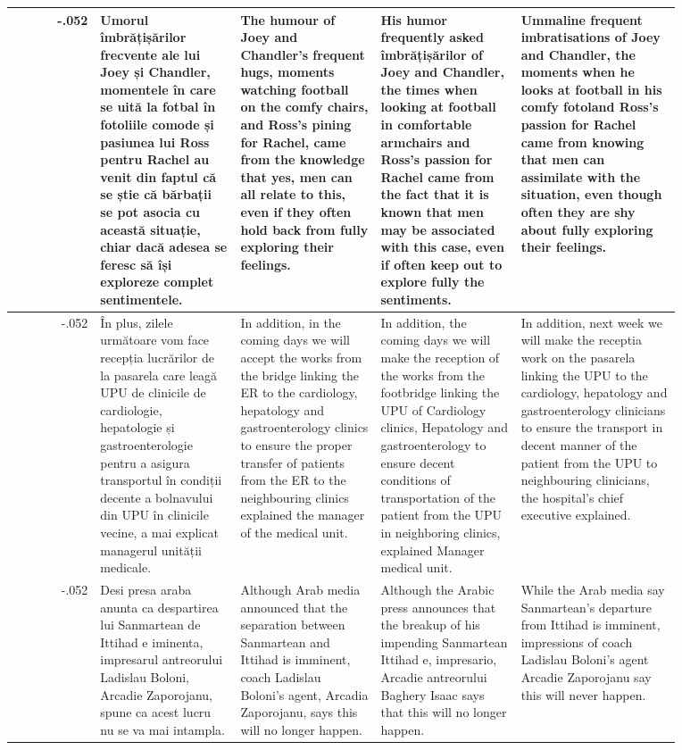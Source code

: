 \begin{table}[ht]
\begin{tabular}{r @{\hspace{1mm}} p{0.21\linewidth}p{0.21\linewidth}p{0.21\linewidth}p{0.24\linewidth}}
-.052 & Umorul îmbrățișărilor frecvente ale lui Joey și Chandler, momentele în care se uită la fotbal în fotoliile comode și pasiunea lui Ross pentru Rachel au venit din faptul că se știe că bărbații se pot asocia cu această situație, chiar dacă adesea se feresc să își exploreze complet sentimentele. & The humour of Joey and Chandler's frequent hugs, moments watching football on the comfy chairs, and Ross's pining for Rachel, came from the knowledge that yes, men can all relate to this, even if they often hold back from fully exploring their feelings. & His humor frequently asked îmbrățișărilor of Joey and Chandler, the times when looking at football in comfortable armchairs and Ross's passion for Rachel came from the fact that it is known that men may be associated with this case, even if often keep out to explore fully the sentiments. & Ummaline frequent imbratisations of Joey and Chandler, the moments when he looks at football in his comfy fotoland Ross's passion for Rachel came from knowing that men can assimilate with the situation, even though often they are shy about fully exploring their feelings. \\\hline
-.052 & În plus, zilele următoare vom face recepția lucrărilor de la pasarela care leagă UPU de clinicile de cardiologie, hepatologie și gastroenterologie pentru a asigura transportul în condiții decente a bolnavului din UPU în clinicile vecine, a mai explicat managerul unității medicale. & In addition, in the coming days we will accept the works from the bridge linking the ER to the cardiology, hepatology and gastroenterology clinics to ensure the proper transfer of patients from the ER to the neighbouring clinics explained the manager of the medical unit. & In addition, the coming days we will make the reception of the works from the footbridge linking the UPU of Cardiology clinics, Hepatology and gastroenterology to ensure decent conditions of transportation of the patient from the UPU in neighboring clinics, explained Manager medical unit. & In addition, next week we will make the receptia work on the pasarela linking the UPU to the cardiology, hepatology and gastroenterology clinicians to ensure the transport in decent manner of the patient from the UPU to neighbouring clinicians, the hospital's chief executive explained. \\\hline
-.052 & Desi presa araba anunta ca despartirea lui Sanmartean de Ittihad e iminenta, impresarul antreorului Ladislau Boloni, Arcadie Zaporojanu, spune ca acest lucru nu se va mai intampla. & Although Arab media announced that the separation between Sanmartean and Ittihad is imminent, coach Ladislau Boloni's agent, Arcadia Zaporojanu, says this will no longer happen. & Although the Arabic press announces that the breakup of his impending Sanmartean Ittihad e, impresario, Arcadie antreorului Baghery Isaac says that this will no longer happen. & While the Arab media say Sanmartean's departure from Ittihad is imminent, impressions of coach Ladislau Boloni's agent Arcadie Zaporojanu say this will never happen. \\\hline

\end{tabular}
\end{table}
